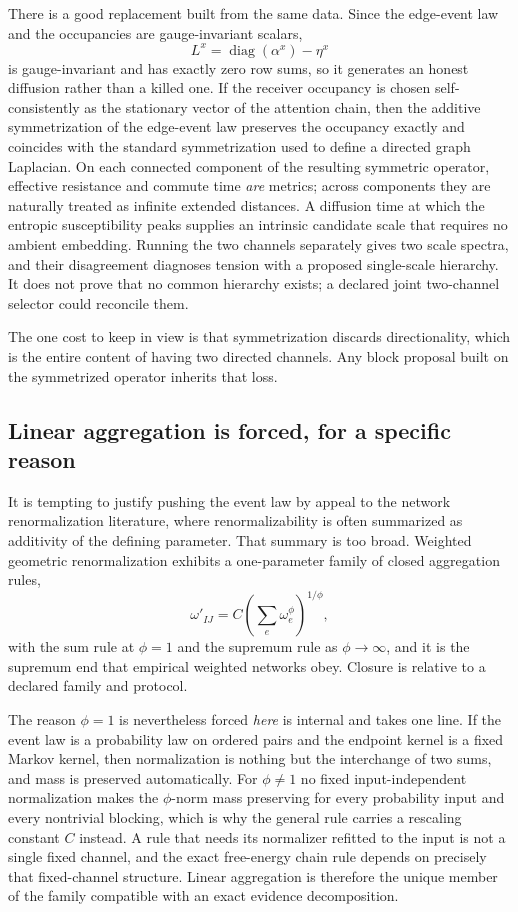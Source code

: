 \documentclass[11pt,letterpaper]{article}
\begin{document}
There is a good replacement built from the same data. Since the edge-event law and
the occupancies are gauge-invariant scalars,
\begin{equation}
L^x = \operatorname{diag}(\alpha^x) - \eta^x
\end{equation}
is gauge-invariant and has exactly zero row sums, so it generates an honest diffusion
rather than a killed one. If the receiver occupancy is chosen self-consistently as the
stationary vector of the attention chain, then the additive symmetrization of the
edge-event law preserves the occupancy exactly and coincides with the standard
symmetrization used to define a directed graph Laplacian. On each connected component
of the resulting symmetric operator, effective resistance and commute time \emph{are}
metrics; across components they are naturally treated as infinite extended distances.
A diffusion time at which the entropic susceptibility peaks supplies an intrinsic
candidate scale that requires no ambient embedding. Running the two channels
separately gives two scale spectra, and their disagreement diagnoses tension with a
proposed single-scale hierarchy. It does not prove that no common hierarchy exists;
a declared joint two-channel selector could reconcile them.

The one cost to keep in view is that symmetrization discards directionality, which is
the entire content of having two directed channels. Any block proposal built on the
symmetrized operator inherits that loss.

\subsection{Linear aggregation is forced, for a specific reason}

It is tempting to justify pushing the event law by appeal to the network
renormalization literature, where renormalizability is often summarized as additivity
of the defining parameter. That summary is too broad. Weighted geometric
renormalization exhibits a one-parameter family of closed aggregation rules,
\begin{equation}
\omega'_{IJ} = C\left(\sum_{e} \omega_e^{\phi}\right)^{1/\phi},
\end{equation}
with the sum rule at $\phi = 1$ and the supremum rule as $\phi \to \infty$, and it is
the supremum end that empirical weighted networks obey. Closure is relative to a
declared family and protocol.

The reason $\phi = 1$ is nevertheless forced \emph{here} is internal and takes one
line. If the event law is a probability law on ordered pairs and the endpoint kernel
is a fixed Markov kernel, then normalization is nothing but the interchange of two
sums, and mass is preserved automatically. For $\phi \ne 1$ no fixed
input-independent normalization makes the $\phi$-norm mass preserving for every
probability input and every nontrivial blocking, which is why the general rule
carries a rescaling constant $C$ instead. A rule that needs its normalizer refitted
to the input is not a single fixed channel, and the exact free-energy chain rule
depends on precisely that fixed-channel structure. Linear aggregation is therefore
the unique member of the family compatible with an exact evidence decomposition.
\end{document}
